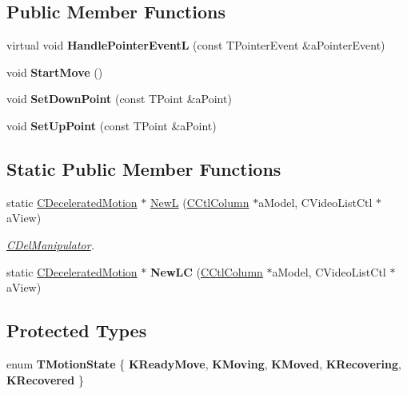 \subsection*{Public Member Functions}
\begin{DoxyCompactItemize}
\item 
\mbox{\label{classCDeceleratedMotion_a1bc6987d63b48780c9ef93c88eae5530}} 
virtual void {\bfseries Handle\+Pointer\+EventL} (const T\+Pointer\+Event \&a\+Pointer\+Event)
\item 
\mbox{\label{classCDeceleratedMotion_a8b11240612fdb78f9e3d202a64368b42}} 
void {\bfseries Start\+Move} ()
\item 
\mbox{\label{classCDeceleratedMotion_a2b4c06a772988cdb40b62415739f10f5}} 
void {\bfseries Set\+Down\+Point} (const T\+Point \&a\+Point)
\item 
\mbox{\label{classCDeceleratedMotion_affc8b87af909f3b7d337981e3e5f2714}} 
void {\bfseries Set\+Up\+Point} (const T\+Point \&a\+Point)
\end{DoxyCompactItemize}
\subsection*{Static Public Member Functions}
\begin{DoxyCompactItemize}
\item 
static \hyperlink{classCDeceleratedMotion}{C\+Decelerated\+Motion} $\ast$ \hyperlink{classCDeceleratedMotion_afe86cb77999ad4f58a4e555208c1a1f0}{NewL} (\hyperlink{classCCtlColumn}{C\+Ctl\+Column} $\ast$a\+Model, C\+Video\+List\+Ctl $\ast$a\+View)
\begin{DoxyCompactList}\small\item\em \hyperlink{classCDelManipulator}{C\+Del\+Manipulator}. \end{DoxyCompactList}\item 
\mbox{\label{classCDeceleratedMotion_a29adc2f04f18bfca6ec676746cae3872}} 
static \hyperlink{classCDeceleratedMotion}{C\+Decelerated\+Motion} $\ast$ {\bfseries New\+LC} (\hyperlink{classCCtlColumn}{C\+Ctl\+Column} $\ast$a\+Model, C\+Video\+List\+Ctl $\ast$a\+View)
\end{DoxyCompactItemize}
\subsection*{Protected Types}
\begin{DoxyCompactItemize}
\item 
\mbox{\label{classCDeceleratedMotion_a7499e52650dbbe1322a271fadcf9663c}} 
enum {\bfseries T\+Motion\+State} \{ \newline
{\bfseries K\+Ready\+Move}, 
{\bfseries K\+Moving}, 
{\bfseries K\+Moved}, 
{\bfseries K\+Recovering}, 
\newline
{\bfseries K\+Recovered}
 \}
\end{DoxyCompactItemize}
